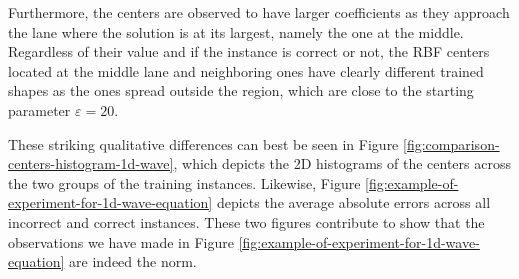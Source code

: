 \documentclass[12pt]{report} %
\begin{document}
Furthermore, the centers are observed to have larger coefficients as they approach the lane where the solution is at its largest, namely the one at the middle. Regardless of their value and if the instance is correct or not, the RBF centers located at the middle lane and neighboring ones have clearly different trained shapes as the ones spread outside the region, which are close to the starting parameter $\varepsilon=20$. 

These striking qualitative differences can best be seen in Figure \ref{fig:comparison-centers-histogram-1d-wave}, which depicts the 2D histograms of the centers across the two groups of the training instances. Likewise, Figure \ref{fig:example-of-experiment-for-1d-wave-equation} depicts the average absolute errors across all incorrect and correct instances. These two figures contribute to show that the observations we have made in Figure \ref{fig:example-of-experiment-for-1d-wave-equation} are indeed the norm.
\end{document}
